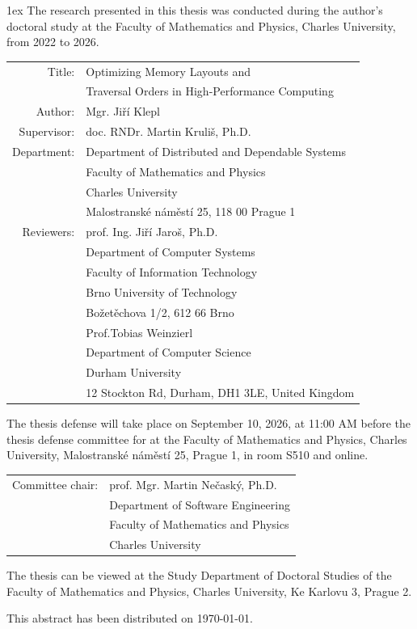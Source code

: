 {
\small
\parskip 1ex
\noindent
The research presented in this thesis was conducted during the author's doctoral study at the Faculty of Mathematics and Physics, Charles University, from 2022 to 2026.

\begin{center}
\begin{tabular}{rl}
Title:
 & Optimizing Memory Layouts and \\
 & Traversal Orders in High-Performance Computing \\
Author:
 & Mgr. Jiří Klepl \\
Supervisor:
 & doc. RNDr. Martin Kruliš, Ph.D. \\
\addlinespace
Department:
 & Department of Distributed and Dependable Systems \\
 & Faculty of Mathematics and Physics \\
 & Charles University \\
 & Malostranské náměstí 25, 118 00 Prague 1 \\
\addlinespace
Reviewers:
 & prof. Ing. Jiří Jaroš, Ph.D. \\
 & Department of Computer Systems \\
 & Faculty of Information Technology \\
 & Brno University of Technology \\
 & Božetěchova 1/2, 612 66 Brno \\
\addlinespace
 & Prof.\@ Tobias Weinzierl \\
 & Department of Computer Science \\
 & Durham University \\
 & 12 Stockton Rd, Durham, DH1 3LE, United Kingdom \\
\end{tabular}
\end{center}

\noindent
The thesis defense will take place on September 10, 2026, at 11:00 AM before the thesis defense committee for \StudyProgramme{} at the Faculty of Mathematics and Physics, Charles University, Malostranské náměstí 25, Prague 1, in room S510 and online.

\begin{center}
\begin{tabular}{rl}
Committee chair:
 & prof. Mgr. Martin Nečaský, Ph.D. \\
 & Department of Software Engineering \\
 & Faculty of Mathematics and Physics \\
 & Charles University \\
\end{tabular}
\end{center}

\noindent
The thesis can be viewed at the Study Department of Doctoral Studies of the Faculty of Mathematics and Physics, Charles University, Ke Karlovu 3, Prague 2.

\noindent
This abstract has been distributed on \today.
}

\newpage


\pagestyle{plain}

